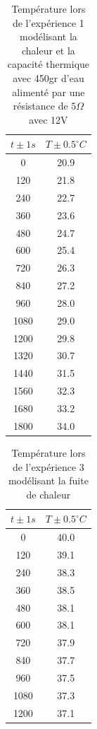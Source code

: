 \documentclass[12pt]{article}
\begin{document}
\begin{table}[h!]
	\begin{center}
		\begin{tabular}{|c|c|}
			\hline
			$t \pm 1 s$ & $T \pm 0.5^\circ C$ \\ \hline
			0 & 20.9   \\
			120 & 21.8 \\
			240 & 22.7 \\
			360 & 23.6 \\
			480 & 24.7 \\
			600 & 25.4 \\
			720 & 26.3 \\
			840 & 27.2 \\
			960 & 28.0 \\
			1080 & 29.0 \\
			1200 & 29.8 \\
			1320 & 30.7 \\
			1440 & 31.5 \\
			1560 & 32.3 \\
			1680 & 33.2 \\
			1800 & 34.0 \\ \hline
		\end{tabular}
	\end{center}
	\caption{Température lors de l'expérience 1 modélisant la chaleur et la capacité thermique avec 450gr d'eau alimenté par une résistance de $5 \Omega$ avec 12V}
\end{table}

\begin{table}[h!]
	\begin{center}
		\begin{tabular}{|c|c|}
			\hline
			$t \pm 1 s$ & $T \pm 0.5^\circ C$ \\ \hline
			0 & 40.0    \\
			120 & 39.1 \\
			240 & 38.3 \\
			360 & 38.5 \\
			480 & 38.1 \\
			600 & 38.1 \\
			720 & 37.9 \\
			840 & 37.7 \\
			960 & 37.5 \\
			1080 & 37.3 \\
			1200 & 37.1 \\ \hline
		\end{tabular}
	\end{center}
	\caption{Température lors de l'expérience 3 modélisant la fuite de chaleur}
\end{table}
\end{document}
